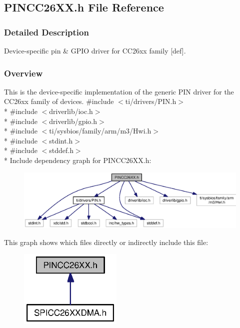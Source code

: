 \subsection{P\+I\+N\+C\+C26\+X\+X.\+h File Reference}
\label{_p_i_n_c_c26_x_x_8h}


\subsubsection{Detailed Description}
Device-\/specific pin \& G\+P\+I\+O driver for C\+C26xx family \mbox{[}def\mbox{]}. 





\subsubsection*{Overview}

This is the device-\/specific implementation of the generic P\+I\+N driver for the C\+C26xx family of devices. {\ttfamily \#include $<$ti/drivers/\+P\+I\+N.\+h$>$}\\*
{\ttfamily \#include $<$driverlib/ioc.\+h$>$}\\*
{\ttfamily \#include $<$driverlib/gpio.\+h$>$}\\*
{\ttfamily \#include $<$ti/sysbios/family/arm/m3/\+Hwi.\+h$>$}\\*
{\ttfamily \#include $<$stdint.\+h$>$}\\*
{\ttfamily \#include $<$stddef.\+h$>$}\\*
Include dependency graph for P\+I\+N\+C\+C26\+X\+X.\+h\+:
\nopagebreak
\begin{figure}[H]
\begin{center}
\leavevmode
\includegraphics[width=350pt]{_p_i_n_c_c26_x_x_8h__incl}
\end{center}
\end{figure}
This graph shows which files directly or indirectly include this file\+:
\nopagebreak
\begin{figure}[H]
\begin{center}
\leavevmode
\includegraphics[width=139pt]{_p_i_n_c_c26_x_x_8h__dep__incl}
\end{center}
\end{figure}
